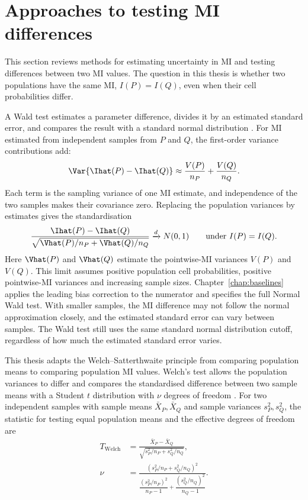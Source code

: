 \section{Approaches to testing MI differences}
\allowdisplaybreaks
\label{sec:welch-background}

This section reviews methods for estimating uncertainty in MI and testing
differences between two MI values. The question in this thesis is whether two
populations have the same MI, \(I(P)=I(Q)\), even when their cell
probabilities differ.


A Wald test estimates a parameter difference, divides it by an estimated
standard error, and compares the result with a standard normal distribution
\citep{wald1943,vanderVaart1998}.
For MI estimated from independent samples from \(P\) and \(Q\), the
first-order variance contributions add:
\begin{equation}
  \Var\{\Ihat(P)-\Ihat(Q)\}
  \approx \frac{V(P)}{n_P}+\frac{V(Q)}{n_Q}.
  \label{eq:background-two-sample-variance}
\end{equation}
Each term is the sampling variance of one MI estimate, and independence of
the two samples makes their covariance zero. Replacing the population variances
by estimates gives the standardisation
\begin{equation}
  \frac{\Ihat(P)-\Ihat(Q)}
       {\sqrt{\Vhat(P)/n_P+\Vhat(Q)/n_Q}}
  \xrightarrow{d}N(0,1)
  \qquad\text{under }I(P)=I(Q).
  \label{eq:background-wald-standardisation}
\end{equation}
Here \(\Vhat(P)\) and \(\Vhat(Q)\) estimate the pointwise-MI variances
\(V(P)\) and \(V(Q)\). This limit assumes positive population cell
probabilities, positive pointwise-MI variances and increasing sample
sizes. Chapter~\ref{chap:baselines} applies the leading bias correction
to the numerator and specifies the full Normal Wald test.
With smaller samples, the MI difference may not follow the normal
approximation closely, and the estimated standard error can vary between
samples. The Wald test still uses the same standard normal distribution
cutoff, regardless of how much the estimated standard error varies.

\medskip
{}

This thesis adapts the Welch--Satterthwaite principle from comparing population
means to comparing population MI values. Welch's test allows the population
variances to differ and compares the standardised difference between two
sample means with a Student \(t\) distribution with \(\nu\) degrees of
freedom \citep{welch1947}. For two independent samples with sample means
\(\bar X_P,\bar X_Q\) and sample variances \(s_P^2,s_Q^2\), the statistic for
testing equal population means and the effective degrees of freedom are
\begin{align}
  T_{\mathrm{Welch}}
  &=\frac{\bar X_P-\bar X_Q}
          {\sqrt{s_P^2/n_P+s_Q^2/n_Q}},\\
  \nu
  &=\frac{\left(s_P^2/n_P+s_Q^2/n_Q\right)^2}
          {\dfrac{(s_P^2/n_P)^2}{n_P-1}
           +\dfrac{(s_Q^2/n_Q)^2}{n_Q-1}}.
  \label{eq:background-ordinary-welch}
\end{align}

